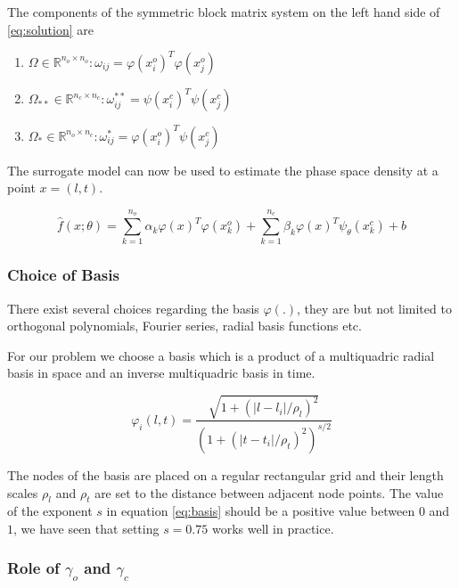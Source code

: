 \documentclass{article}
\begin{document}
The components of the symmetric block matrix system on the left hand side of 
\ref{eq:solution} are 
\begin{enumerate}
\item $\Omega \in \mathbb{R}^{n_{o} \times n_{o}}: \omega_{ij} = \varphi(x^{o}_{i})^{T} \varphi(x^{o}_{j})$
\item $\Omega_{**} \in \mathbb{R}^{n_{c} \times n_{c}}: \omega^{**}_{ij} = \psi(x^{c}_{i})^{T} \psi(x^{c}_{j})$
\item $\Omega_{*} \in \mathbb{R}^{n_{o} \times n_{c}}: \omega^{*}_{ij} = \varphi(x^{o}_{i})^{T} \psi(x^{c}_{j})$
\end{enumerate}

The surrogate model can now be used to estimate the phase space density 
at a point $x = (l,t)$.

\begin{equation}\label{eq:model}
\hat{f}(x;\theta) = \sum_{k = 1}^{n_{o}}{\alpha_{k}\varphi(x)^{T}\varphi(x^{o}_{k}) + \sum_{k = 1}^{n_{c}}}{\beta_{k} \varphi(x)^{T} \psi_{\theta}(x^{c}_{k})} + b
\end{equation}

\subsubsection*{Choice of Basis}

There exist several choices regarding the basis $\varphi(.)$, they are but not limited to 
orthogonal polynomials, Fourier series, radial basis functions etc. 

For our problem we choose a basis which is a product of a multiquadric radial basis in space and 
an inverse multiquadric basis in time.

\begin{equation}\label{eq:basis}
\varphi_{i}(l,t) = \frac{\sqrt{1+(|l - l_{i}|/\rho_{l})^{2}}}{(1+(|t - t_{i}|/\rho_{t})^{2})^{s/2}}
\end{equation}

The nodes of the basis are placed on a regular rectangular grid and their 
length scales $\rho_l$ and $\rho_t$ are set to the distance between adjacent
node points. The value of the exponent $s$ in equation \ref{eq:basis} should be
a positive value between $0$ and $1$, we have seen that setting $s = 0.75$ works well
in practice.

\subsubsection*{Role of $\gamma_o$ and $\gamma_c$}
\end{document}
